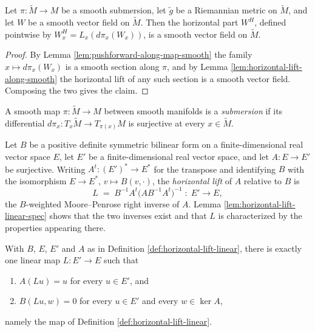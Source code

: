 \begin{lemma}
\label{lem:horizontal-projection-field-smooth}
\leanok
{}
Let $\pi : \tilde{M} \to M$ be a smooth submersion, let $\tilde{g}$ be a Riemannian metric on $\tilde{M}$, and let $W$ be a smooth vector field on $\tilde{M}$. Then the horizontal part $W^H$, defined pointwise by $W^H_x = L_x(d\pi_x(W_x))$, is a smooth vector field on $\tilde{M}$.
\end{lemma}

\begin{proof}
\leanok
By Lemma \ref{lem:pushforward-along-map-smooth} the family $x \mapsto d\pi_x(W_x)$ is a smooth section along $\pi$, and by Lemma \ref{lem:horizontal-lift-along-smooth} the horizontal lift of any such section is a smooth vector field. Composing the two gives the claim.
\end{proof}

\begin{definition}
\label{def:submersion}
\leanok
A smooth map $\pi : \tilde{M} \to M$ between smooth manifolds is a \emph{submersion} if its differential $d\pi_x : T_x\tilde{M} \to T_{\pi(x)}M$ is surjective at every $x \in \tilde{M}$.
\end{definition}

\begin{definition}
\label{def:horizontal-lift-linear}
\leanok
Let $B$ be a positive definite symmetric bilinear form on a finite-dimensional real vector space $E$, let $E'$ be a finite-dimensional real vector space, and let $A : E \to E'$ be surjective. Writing $A^t : (E')^* \to E^*$ for the transpose and identifying $B$ with the isomorphism $E \to E^*$, $v \mapsto B(v, \cdot)$, the \emph{horizontal lift} of $A$ relative to $B$ is
\[
L \;=\; B^{-1}A^t\bigl(AB^{-1}A^t\bigr)^{-1} \;:\; E' \to E ,
\]
the $B$-weighted Moore--Penrose right inverse of $A$. Lemma \ref{lem:horizontal-lift-linear-spec} shows that the two inverses exist and that $L$ is characterized by the properties appearing there.
\end{definition}

\begin{lemma}
\label{lem:horizontal-lift-linear-spec}
\leanok
{}
With $B$, $E$, $E'$ and $A$ as in Definition \ref{def:horizontal-lift-linear}, there is exactly one linear map $L : E' \to E$ such that
\begin{enumerate}
\item[(i)] $A(Lu) = u$ for every $u \in E'$, and
\item[(ii)] $B(Lu, w) = 0$ for every $u \in E'$ and every $w \in \ker A$,
\end{enumerate}
namely the map of Definition \ref{def:horizontal-lift-linear}.
\end{lemma}

